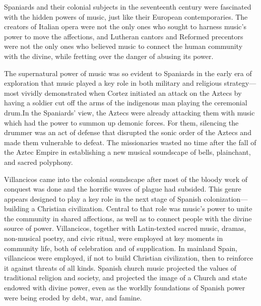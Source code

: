 

\label{ch:sacred-power}

Spaniards and their colonial subjects in the seventeenth century were fascinated with the hidden powers of music, just like their European contemporaries.
The creators of Italian opera were not the only ones who sought to harness music's power to move the affections, and Lutheran cantors and Reformed precentors were not the only ones who believed music to connect the human community with the divine, while fretting over the danger of abusing its power.\citXXX{}

The supernatural power of music was so evident to Spaniards in the early era of exploration that music played a key role in both military and religious strategy---most vividly demonstrated when Cortez initiated an attack on the Aztecs by having a soldier cut off the arms of the indigenous man playing the ceremonial  drum.
In the Spaniards' view, the Aztecs were already attacking them with music which had the power to summon up demonic forces. 
For them, silencing the drummer was an act of defense that disrupted the sonic order of the Aztecs and made them vulnerable to defeat.
The missionaries wasted no time after the fall of the Aztec Empire in establishing a new musical soundscape of bells, plainchant, and sacred polyphony.\citXXX{}

Villancicos came into the colonial soundscape after most of the bloody work of conquest was done and the horrific waves of plague had subsided.
This genre appears designed to play a key role in the next stage of Spanish colonization---building a Christian civilization.
Central to that role was music's power to unite the community in shared affections, as well as to connect people with the divine source of power.
Villancicos, together with Latin-texted sacred music, dramas, non-musical poetry, and civic ritual, were employed at key moments in community life, both of celebration and of supplication.\citXXX{}
In mainland Spain, villancicos were employed, if not to build Christian civilization, then to reinforce it against threats of all kinds.
Spanish church music projected the values of traditional religion and society, and projected the image of a Church and state endowed with divine power, even as the worldly foundations of Spanish power were being eroded by debt, war, and famine.\citXXX{}



















